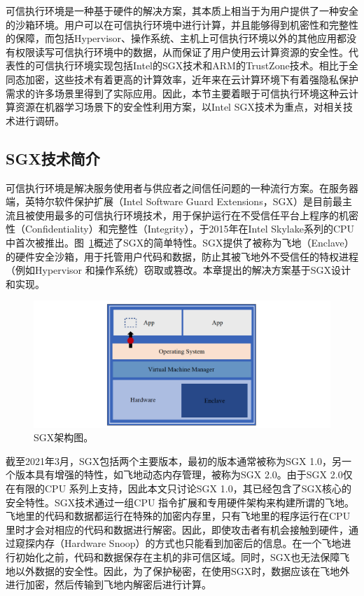 可信执行环境是一种基于硬件的解决方案，其本质上相当于为用户提供了一种安全的沙箱环境。用户可以在可信执行环境中进行计算，并且能够得到机密性和完整性的保障，而包括Hypervisor、操作系统、主机上可信执行环境以外的其他应用都没有权限读写可信执行环境中的数据，从而保证了用户使用云计算资源的安全性。代表性的可信执行环境实现包括Intel的SGX技术和ARM的TrustZone技术。相比于全同态加密，这些技术有着更高的计算效率，近年来在云计算环境下有着强隐私保护需求的许多场景里得到了实际应用。因此，本节主要着眼于可信执行环境这种云计算资源在机器学习场景下的安全性利用方案，以Intel SGX技术为重点，对相关技术进行调研。

\subsection{SGX技术简介}
可信执行环境是解决服务使用者与供应者之间信任问题的一种流行方案。在服务器端，英特尔软件保护扩展（Intel Software Guard Extensions，SGX）是目前最主流且被使用最多的可信执行环境技术，用于保护运行在不受信任平台上程序的机密性（Confidentiality）和完整性（Integrity），于2015年在Intel Skylake系列的CPU中首次被推出。图~\ref{sgx_arch}概述了SGX的简单特性。SGX提供了被称为飞地（Enclave）的硬件安全沙箱，用于托管用户代码和数据，防止其被飞地外不受信任的特权进程（例如Hypervisor 和操作系统）窃取或篡改。本章提出的解决方案基于SGX设计和实现。

\begin{figure}[h]
    \centerline{\includegraphics[width=\textwidth]{figures/sgx-arch.png}}
    \caption{SGX架构图。}
    \label{sgx_arch}
\end{figure}

截至2021年3月，SGX包括两个主要版本，最初的版本通常被称为SGX 1.0，另一个版本具有增强的特性，如飞地动态内存管理，被称为SGX 2.0。由于SGX 2.0仅在有限的CPU 系列上支持，因此本文只讨论SGX 1.0，其已经包含了SGX核心的安全特性。SGX技术通过一组CPU 指令扩展和专用硬件架构来构建所谓的飞地。飞地里的代码和数据都运行在特殊的加密内存里，只有飞地里的程序运行在CPU 里时才会对相应的代码和数据进行解密。因此，即使攻击者有机会接触到硬件，通过窥探内存（Hardware Snoop）的方式也只能看到加密后的信息。在一个飞地进行初始化之前，代码和数据保存在主机的非可信区域。同时，SGX也无法保障飞地以外数据的安全性。因此，为了保护秘密，在使用SGX时，数据应该在飞地外进行加密，然后传输到飞地内解密后进行计算。

